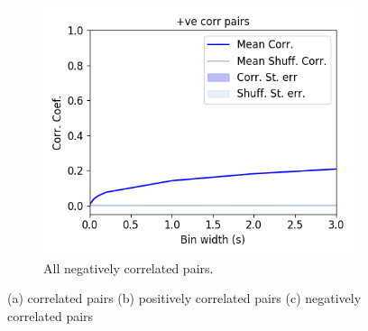 \documentclass[a4paper,12pt]{article}
\theoremstyle{definition}
\begin{document}
\begin{figure}[h]
\begin{subfigure}[h]{0.5\linewidth}
          \label{fig:correlations_pos_pairs}
        \end{subfigure}
        \begin{subfigure}[h]{0.5\linewidth}
          \includegraphics[width=\linewidth]{figures/Krebs_corr_pos_pairs.png}
          \caption{All negatively correlated pairs.}
          \label{fig:correlations_neg_pairs}
        \end{subfigure}
        \caption{(a) correlated pairs (b) positively correlated pairs (c) negatively correlated pairs}
        \label{fig:correlations_vs_bin_widths}
    \end{figure}

    \newpage

%
%
%
\end{document}
